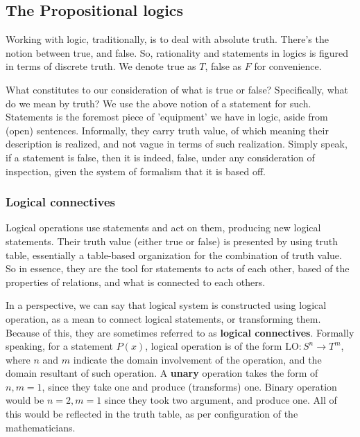 \subsection{The Propositional logics}

Working with logic, traditionally, is to deal with absolute truth. There's the notion between true, and false. So, rationality and statements in logics is figured in terms of discrete truth. We denote true as $T$, false as $F$ for convenience. 

What constitutes to our consideration of what is true or false? Specifically, what do we mean by truth? We use the above notion of a statement for such. Statements is the foremost piece of 'equipment' we have in logic, aside from (open) sentences. Informally, they carry truth value, of which meaning their description is realized, and not vague in terms of such realization. Simply speak, if a statement is false, then it is indeed, false, under any consideration of inspection, given the system of formalism that it is based off. 


\subsubsection{Logical connectives}
Logical operations use statements and act on them, producing new logical statements. Their truth value (either true or false) is presented by using truth table, essentially a table-based organization for the combination of truth value. So in essence, they are the tool for statements to acts of each other, based of the properties of relations, and what is connected to each others. 

In a perspective, we can say that  logical system is constructed using  logical operation, as a mean to connect logical statements, or transforming them. Because of this, they are sometimes referred to as \textbf{logical connectives}. Formally speaking, for a statement $P(x)$, logical operation is of the form $\mathrm{LO}: S^{n}\to T^m$, where $n$ and $m$ indicate the domain involvement of the operation, and the domain resultant of such operation. A \textbf{unary} operation takes the form of $n,m=1$, since they take one and produce (transforms) one. Binary operation would be $n=2, m =1$ since they took two argument, and produce one. All of this would be reflected in the truth table, as per configuration of the mathematicians. 

